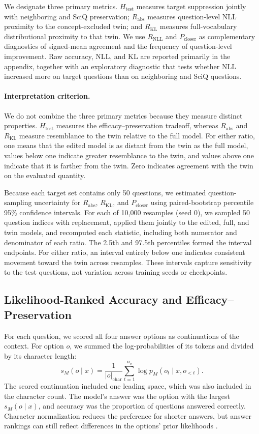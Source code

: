 We designate three primary metrics. $H_{\mathrm{test}}$ measures target
suppression jointly with neighboring and SciQ preservation;
$R_{\mathrm{abs}}$ measures question-level NLL proximity to the
concept-excluded twin; and $R_{\mathrm{KL}}$ measures full-vocabulary
distributional proximity to that twin. We use $R_{\mathrm{NLL}}$ and
$P_{\mathrm{closer}}$ as complementary diagnostics of signed-mean agreement
and the frequency of question-level improvement. Raw accuracy, NLL, and KL are reported primarily in the appendix, together
with an exploratory diagnostic that tests whether NLL increased more on target
questions than on neighboring and SciQ questions.

\paragraph{Interpretation criterion.}
We do not combine the three primary metrics because they measure distinct
properties. $H_{\mathrm{test}}$ measures the efficacy--preservation tradeoff,
whereas $R_{\mathrm{abs}}$ and $R_{\mathrm{KL}}$ measure resemblance to the
twin relative to the full model. For either ratio, one means that the edited
model is as distant from the twin as the full model, values below one indicate
greater resemblance to the twin, and values above one indicate that it is
farther from the twin. Zero indicates agreement with the twin on the evaluated
quantity.

Because each target set contains only 50 questions, we estimated
question-sampling uncertainty for $R_{\mathrm{abs}}$, $R_{\mathrm{KL}}$, and
$P_{\mathrm{closer}}$ using paired-bootstrap percentile 95\% confidence
intervals. For each of 10,000 resamples (seed 0), we sampled 50 question
indices with replacement, applied them jointly to the edited, full, and twin
models, and recomputed each statistic, including both numerator and denominator
of each ratio. The 2.5th and 97.5th percentiles formed the interval endpoints.
For either ratio, an interval entirely below one indicates consistent movement
toward the twin across resamples. These intervals capture sensitivity to the
test questions, not variation across training seeds or checkpoints.

\subsection{Likelihood-Ranked Accuracy and Efficacy--Preservation}

For each question, we scored all four answer options as continuations of the
context. For option $o$, we summed the log-probabilities of its tokens and
divided by its character length:
\begin{equation}
s_M(o\mid x)
=
\frac{1}{|o|_{\mathrm{char}}}
\sum_{t=1}^{n_o}
\log p_M(o_t\mid x,o_{<t}).
\end{equation}
The scored continuation included one leading space, which was also included
in the character count. The model's answer was the option with the largest
$s_M(o\mid x)$, and accuracy was the proportion of questions answered
correctly. Character normalization reduces the preference for shorter answers, but
answer rankings can still reflect differences in the options' prior
likelihoods \citep{gu2025olmes}.


